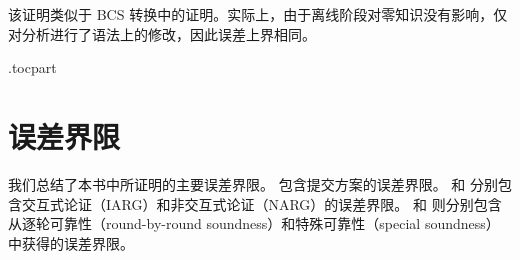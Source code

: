 \documentclass[american,singlepageview]{snargs-book-zh}
\begin{document}
该证明类似于 BCS 转换中的证明。实际上，由于离线阶段对零知识没有影响，仅对分析进行了语法上的修改，因此误差上界相同。


\etocsetlocaltop.toc{part}
\backmatter
{}



\chapter{误差界限}
\label{section:error-bounds}

我们总结了本书中所证明的主要误差界限。 包含提交方案的误差界限。 和  分别包含交互式论证（IARG）和非交互式论证（NARG）的误差界限。 和  则分别包含从逐轮可靠性（round-by-round soundness）和特殊可靠性（special soundness）中获得的误差界限。

\vfill
\end{document}
